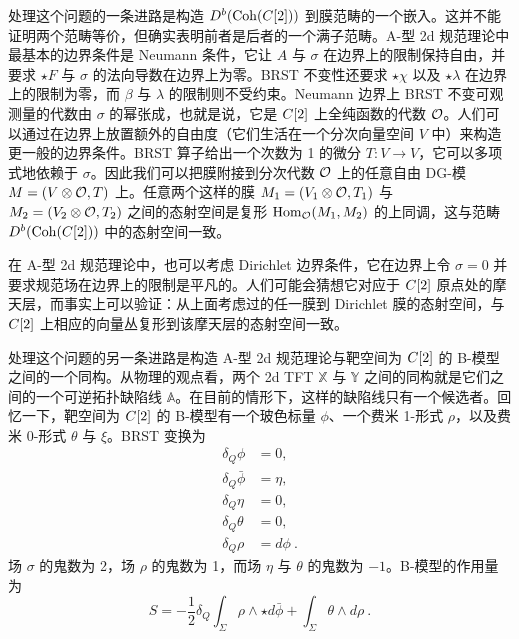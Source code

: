 处理这个问题的一条进路是构造 $D^b(\operatorname{Coh}(C[2]))$ 到膜范畴的一个嵌入。这并不能证明两个范畴等价，但确实表明前者是后者的一个满子范畴。A-型 2d 规范理论中最基本的边界条件是 Neumann 条件，它让 $A$ 与 $\sigma$ 在边界上的限制保持自由，并要求 $\star F$ 与 $\sigma$ 的法向导数在边界上为零。BRST 不变性还要求 $\star\chi$ 以及 $\star\lambda$ 在边界上的限制为零，而 $\beta$ 与 $\lambda$ 的限制则不受约束。Neumann 边界上 BRST 不变可观测量的代数由 $\sigma$ 的幂张成，也就是说，它是 $C[2]$ 上全纯函数的代数 $\mathcal{O}$。人们可以通过在边界上放置额外的自由度（它们生活在一个分次向量空间 $V$ 中）来构造更一般的边界条件。BRST 算子给出一个次数为 1 的微分 $T:V\to V$，它可以多项式地依赖于 $\sigma$。因此我们可以把膜附接到分次代数 $\mathcal{O}$ 上的任意自由 DG-模 $M=(V\otimes\mathcal{O},T)$ 上。任意两个这样的膜 $M_1=(V_1\otimes\mathcal{O},T_1)$ 与 $M_2=(V_2\otimes\mathcal{O},T_2)$ 之间的态射空间是复形 $\operatorname{Hom}_{\mathcal{O}}(M_1,M_2)$ 的上同调，这与范畴 $D^b(\operatorname{Coh}(C[2]))$ 中的态射空间一致。

在 A-型 2d 规范理论中，也可以考虑 Dirichlet 边界条件，它在边界上令 $\sigma=0$ 并要求规范场在边界上的限制是平凡的。人们可能会猜想它对应于 $C[2]$ 原点处的摩天层，而事实上可以验证：从上面考虑过的任一膜到 Dirichlet 膜的态射空间，与 $C[2]$ 上相应的向量丛复形到该摩天层的态射空间一致。


处理这个问题的另一条进路是构造 A-型 2d 规范理论与靶空间为 $C[2]$ 的 B-模型之间的一个同构。从物理的观点看，两个 2d TFT $\mathbb{X}$ 与 $\mathbb{Y}$ 之间的同构就是它们之间的一个可逆拓扑缺陷线 $\mathbb{A}$。在目前的情形下，这样的缺陷线只有一个候选者。回忆一下，靶空间为 $C[2]$ 的 B-模型有一个玻色标量 $\phi$、一个费米 1-形式 $\rho$，以及费米 0-形式 $\theta$ 与 $\xi$。BRST 变换为
\begin{align*}
\delta_Q\phi &= 0, \\
\delta_Q\bar\phi &= \eta, \\
\delta_Q\eta &= 0, \\
\delta_Q\theta &= 0, \\
\delta_Q\rho &= d\phi \ .
\end{align*}
场 $\sigma$ 的鬼数为 2，场 $\rho$ 的鬼数为 1，而场 $\eta$ 与 $\theta$ 的鬼数为 $-1$。B-模型的作用量为
\[ S = -\frac{1}{2}\delta_Q\int_\Sigma\rho\wedge\star d\bar\phi + \int_\Sigma\theta\wedge d\rho \ . \]


